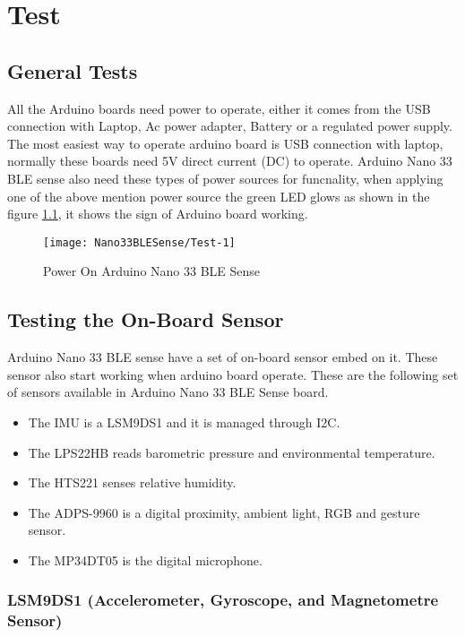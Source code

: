 \chapter{Test}

\section{General Tests}

All the Arduino boards need power to operate, either it comes from the USB connection with Laptop, Ac power adapter, Battery or a regulated power supply. The most easiest way to operate arduino board is USB connection with laptop, normally these boards need 5V direct current (DC) to operate. Arduino Nano 33 BLE sense also need these types of power sources for funcnality, when applying one of the above mention power source the green LED glows as shown in the figure \ref{fig:Test}, it shows the sign of Arduino board working.

\begin{figure}[htbp]
	\centering
	\texttt{[image: Nano33BLESense/Test-1]}
	\caption{Power On Arduino Nano 33 BLE Sense}
	\label{fig:Test}
\end{figure}

\section{Testing the On-Board Sensor}

Arduino Nano 33 BLE sense have a set of on-board sensor embed on it. These sensor also start working when arduino board operate. These are the following set of sensors available in Arduino Nano 33 BLE Sense board.
\begin{itemize}
	\item The IMU is a LSM9DS1 and it is managed through I2C.
	\item The LPS22HB reads barometric pressure and environmental temperature.
	\item The HTS221 senses relative humidity.
	\item The ADPS-9960 is a digital proximity, ambient light, RGB and gesture sensor.
	\item The MP34DT05 is the digital microphone.
\end{itemize} 

\subsection{LSM9DS1 (Accelerometer, Gyroscope, and Magnetometre Sensor)}

